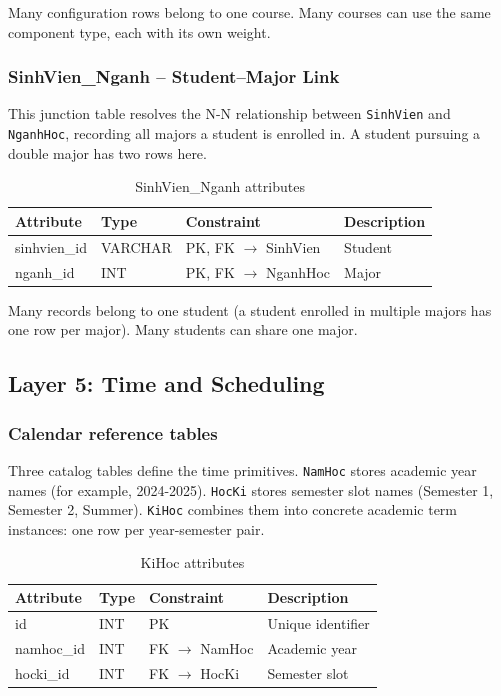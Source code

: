 \documentclass[12pt,a4paper]{report}
\begin{document}
Many configuration rows belong to one course. Many courses can use the same component type, each with its own weight.

\subsubsection{SinhVien\_Nganh -- Student--Major Link}

This junction table resolves the N-N relationship between \texttt{SinhVien} and \texttt{NganhHoc}, recording all majors a student is enrolled in. A student pursuing a double major has two rows here.

\begin{table}[H]
\renewcommand{\arraystretch}{1.35}
\caption{SinhVien\_Nganh attributes}
\label{tab:sv_nganh}
\begin{tabular}{|p{3cm}|p{2.5cm}|p{3cm}|p{5cm}|}
  \hline
  \textbf{Attribute} & \textbf{Type} & \textbf{Constraint} & \textbf{Description} \\
  \hline
  sinhvien\_id & VARCHAR & PK, FK $\to$ SinhVien & Student \\
  \hline
  nganh\_id & INT & PK, FK $\to$ NganhHoc & Major \\
  \hline
\end{tabular}
\end{table}

Many records belong to one student (a student enrolled in multiple majors has one row per major). Many students can share one major.

\subsection{Layer 5: Time and Scheduling}

\subsubsection{Calendar reference tables}

Three catalog tables define the time primitives. \texttt{NamHoc} stores academic year names (for example, 2024-2025). \texttt{HocKi} stores semester slot names (Semester 1, Semester 2, Summer). \texttt{KiHoc} combines them into concrete academic term instances: one row per year-semester pair.

\begin{table}[H]
\renewcommand{\arraystretch}{1.35}
\caption{KiHoc attributes}
\label{tab:kihoc}
\begin{tabular}{|p{3cm}|p{2.5cm}|p{2.5cm}|p{5.5cm}|}
  \hline
  \textbf{Attribute} & \textbf{Type} & \textbf{Constraint} & \textbf{Description} \\
  \hline
  id & INT & PK & Unique identifier \\
  \hline
  namhoc\_id & INT & FK $\to$ NamHoc & Academic year \\
  \hline
  hocki\_id & INT & FK $\to$ HocKi & Semester slot \\
  \hline
\end{tabular}
\end{table}
\end{document}

